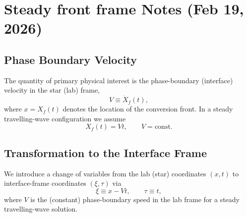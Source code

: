 \documentclass[11pt]{article}
\begin{document}
\newpage
\section*{Steady front frame Notes (Feb 19, 2026)}

\subsection*{Phase Boundary Velocity}

The quantity of primary physical interest is the phase-boundary (interface) 
velocity in the star (lab) frame,
\begin{equation}
V \equiv \dot X_f(t),
\end{equation}
where $x = X_f(t)$ denotes the location of the conversion front.
In a steady travelling-wave configuration we assume
\begin{equation}
X_f(t) = V t, \qquad V = \text{const}.
\end{equation}

\subsection*{Transformation to the Interface Frame}

We introduce a change of variables from the lab (star) coordinates $(x,t)$ to
interface-frame coordinates $(\xi,\tau)$ via
\begin{equation}
\xi \equiv x - V t, \qquad \tau \equiv t,
\end{equation}
where $V$ is the (constant) phase-boundary speed in the lab frame for a steady
travelling-wave solution.
\end{document}
